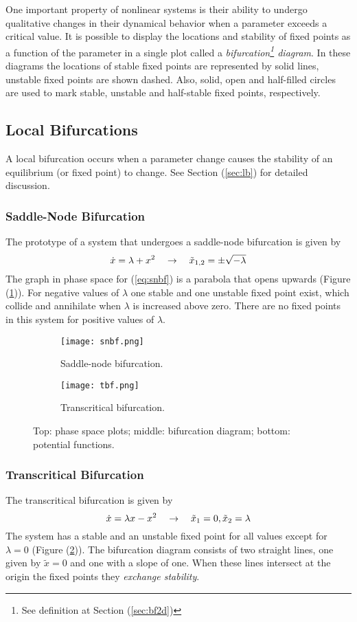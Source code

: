 One important property of nonlinear systems is their ability to undergo qualitative changes in their dynamical behavior when a parameter exceeds a critical value.
It is possible to display the locations and stability of fixed points as a function of the parameter in a single plot called a \emph{bifurcation\footnote{See definition at Section (\ref{sec:bf2d})} diagram}.
In these diagrams the locations of stable fixed points are represented by solid lines, unstable fixed points are shown dashed.
Also, solid, open and half-filled circles are used to mark stable, unstable and half-stable fixed points, respectively.
\subsection{Local Bifurcations}
A local bifurcation occurs when a parameter change causes the stability of an equilibrium (or fixed point) to change. See Section (\ref{sec:lb}) for detailed discussion.
\subsubsection{Saddle-Node Bifurcation}{\label{sec:snbf}}
The prototype of a system that undergoes a saddle-node bifurcation is given by
\begin{equation}{\label{eq:snbf}}
  \dot{x}=\lambda+x^2 \quad \rightarrow \quad \tilde{x}_{1,2}=\pm\sqrt{-\lambda}
\end{equation}
The graph in phase space for (\ref{eq:snbf}) is a parabola that opens upwards (Figure (\ref{fig:snbf})).
For negative values of $\lambda$ one stable and one unstable fixed point exist, which collide and annihilate when $\lambda$ is increased above zero.
There are no fixed points in this system for positive values of $\lambda$.
\begin{figure}[h!]
  \centering
  \begin{subfigure}{0.45\linewidth}
    \texttt{[image: snbf.png]}
    \caption{Saddle-node bifurcation.}
    \label{fig:snbf}
  \end{subfigure}
  \vline
  \begin{subfigure}{0.45\linewidth}
    \texttt{[image: tbf.png]}
    \caption{Transcritical bifurcation.}
    \label{fig:tbf}
  \end{subfigure}
  \caption{Top: phase space plots; middle: bifurcation diagram; bottom: potential functions.}
  \label{fig:stbf}
\end{figure}
\subsubsection{Transcritical Bifurcation}
The transcritical bifurcation is given by
\begin{equation}{\label{eq:tbf}}
  \dot{x}=\lambda x-x^2 \quad \rightarrow \quad \tilde{x}_1=0, \tilde{x}_2=\lambda
\end{equation}
The system has a stable and an unstable fixed point for all values except for $\lambda=0$ (Figure (\ref{fig:tbf})).
The bifurcation diagram consists of two straight lines, one given by $\tilde{x}=0$ and one with a slope of one.
When these lines intersect at the origin the fixed points they \emph{exchange stability}.
